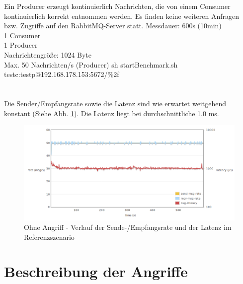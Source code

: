\documentclass[	a4paper,
			11pt,
			titlepage,
			oneside,
			fleqn,
			listof=totoc,
			parskip,
			numbers=noenddot]{scrartcl}
\begin{document}
		{Ein Producer erzeugt kontinuierlich Nachrichten, die von einem Consumer kontinuierlich korrekt entnommen werden. Es finden keine weiteren Anfragen bzw. Zugriffe auf den RabbitMQ-Server statt.}%
		{%
		 Messdauer: 600s (10min)\\
		 1 Consumer \\
		 1 Producer \\
		 Nachrichtengröße: 1024 Byte\\
		 Max. 50 Nachrichten/s (Producer)
		}%
		{sh startBenchmark.sh testc:testp@192.168.178.153:5672/\%2f}%
		{%
		 \\
		 \\
		 \\
		}%
		{Die Sender/Empfangsrate sowie die Latenz sind wie erwartet weitgehend konstant (Siehe Abb. \ref{fig:idlestd}). Die Latenz liegt bei durchschnittliche 1.0 ms.}
		\begin{figure}[!htb]
			\centering
			\includegraphics[width=\textwidth]{img/std.png}
			\caption{Ohne Angriff - Verlauf der Sende-/Empfangsrate und der Latenz im Referenzszenario}
			\label{fig:idlestd}
		\end{figure}
	
	
\clearpage
\section*{Beschreibung der Angriffe}
\end{document}
